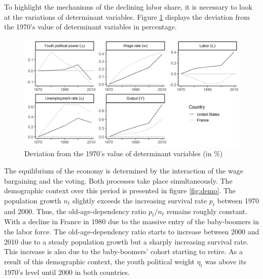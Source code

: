 To highlight the mechanisms of the declining labor share, it is necessary to look at the variations of determinant variables. 
Figure \ref{fig:dev_multiple7010} displays the deviation from the 1970's value of determinant variables in percentage. 
\begin{figure}[tb]
	\centering
	\caption{Deviation from the 1970's value of determinant variables (in \%)} \label{fig:dev_multiple7010}
	\includegraphics[width=1\linewidth]{../result/deviation/dev_multiple7010.png}
\end{figure}
The equilibrium of the economy is determined by the interaction of the wage bargaining and the voting. Both processes take place simultaneously. The demographic context over this period is presented in figure \ref{fig:demo}. The population growth $n_t$ slightly exceeds the increasing survival rate $p_t$ between 1970 and 2000. Thus, the old-age-dependency ratio $p_t/n_t$ remains roughly constant. With a decline in France in 1980 due to the massive entry of the baby-boomers in the labor force. The old-age-dependency ratio starts to increase between 2000 and 2010 due to a steady population growth but a sharply increasing survival rate. This increase is also due to the baby-boomers' cohort starting to retire. As a result of this demographic context, the youth political weight $\eta_t$ was above its 1970's level until 2000 in both countries.

